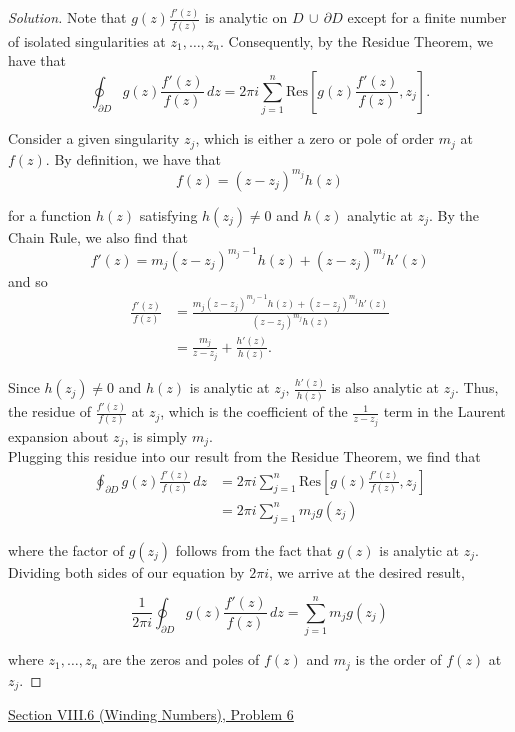 \documentclass[11pt]{article}
\newenvironment{solution}
  {\renewcommand\qedsymbol{$\blacksquare$}\begin{proof}[Solution]}
  {\end{proof}}
\theoremstyle{definition}
\begin{document}
\begin{solution} Note that $g(z) \frac{f'(z)}{f(z)}$ is analytic on $D \, \cup \, \partial D$ except for a finite number of isolated singularities at $z_1, \dots, z_n$. Consequently, by the Residue Theorem, we have that
\[ \oint_{\partial D} g(z) \frac{f'(z)}{f(z)} \, dz = 2\pi i \sum\limits_{j=1}^n \mathrm{Res}\left[g(z) \frac{f'(z)}{f(z)}, z_j\right].\]

Consider a given singularity $z_j$, which is either a zero or pole of order $m_j$ at $f(z)$. By definition, we have that
\[ f(z) = (z-z_j)^{m_j}h(z)\]

for a function $h(z)$ satisfying $h(z_j) \neq 0$ and $h(z)$ analytic at $z_j$. By the Chain Rule, we also find that \[ f'(z) = m_j (z-z_j)^{m_j - 1} h(z) + (z-z_j)^{m_j} h'(z)\] and so 
\begin{align*} \frac{f'(z)}{f(z)} &= \frac{m_j (z-z_j)^{m_j - 1} h(z) + (z-z_j)^{m_j} h'(z)}{(z-z_j)^{m_j}h(z)} \\
&= \frac{m_j}{z-z_j} + \frac{h'(z)}{h(z)}.
\end{align*}

Since $h(z_j) \neq 0$ and $h(z)$ is analytic at $z_j$, $\frac{h'(z)}{h(z)}$ is also analytic at $z_j$. Thus, the residue of $\frac{f'(z)}{f(z)}$ at $z_j$, which is the coefficient of the $\frac{1}{z-z_j}$ term in the Laurent expansion about $z_j$, is simply $m_j$. \\

Plugging this residue into our result from the Residue Theorem, we find that
\begin{align*} \oint_{\partial D} g(z) \frac{f'(z)}{f(z)} \, dz &= 2\pi i \sum\limits_{j=1}^n \mathrm{Res}\left[g(z) \frac{f'(z)}{f(z)}, z_j\right] \\
&= 2\pi i \sum\limits_{j=1}^n m_jg(z_j)\end{align*}

where the factor of $g(z_j)$ follows from the fact that $g(z)$ is analytic at $z_j$. \\

Dividing both sides of our equation by $2\pi i$, we arrive at the desired result,

\[ \frac{1}{2\pi i} \oint_{\partial D} g(z) \frac{f'(z)}{f(z)} \, dz = \sum \limits_{j=1}^n m_j g(z_j) \]

where $z_1, \dots, z_n$ are the zeros and poles of $f(z)$ and $m_j$ is the order of $f(z)$ at $z_j$. \end{solution}
\newpage

\underline{Section VIII.6 (Winding Numbers), Problem 6}\\
\end{document}
